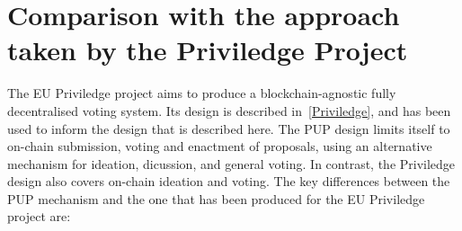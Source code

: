 \section{Comparison with the approach taken by the Priviledge Project}
\label{sect:priviledge}

The EU Priviledge project aims to produce a blockchain-agnostic fully decentralised voting system.
Its design is described in~\ref{Priviledge}, and has been used to inform the design that is described here.
The PUP design limits itself to on-chain submission, voting and enactment of proposals, using an alternative mechanism
for ideation, dicussion, and general voting.  In contrast, the Priviledge design also covers on-chain ideation and voting.
The key differences between the PUP mechanism and the one that has been produced for the EU Priviledge project are:

